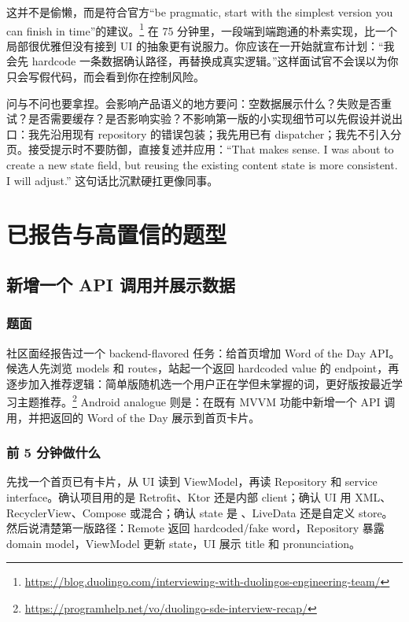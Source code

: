 这并不是偷懒，而是符合官方“be pragmatic, start with the simplest version you can finish in time”的建议。\srcofficial\footnote{\url{https://blog.duolingo.com/interviewing-with-duolingos-engineering-team/}} 在 75 分钟里，一段端到端跑通的朴素实现，比一个局部很优雅但没有接到 UI 的抽象更有说服力。你应该在一开始就宣布计划：“我会先 hardcode 一条数据确认路径，再替换成真实逻辑。”这样面试官不会误以为你只会写假代码，而会看到你在控制风险。

问与不问也要拿捏。会影响产品语义的地方要问：空数据展示什么？失败是否重试？是否需要缓存？是否影响实验？不影响第一版的小实现细节可以先假设并说出口：我先沿用现有 repository 的错误包装；我先用已有 dispatcher；我先不引入分页。接受提示时不要防御，直接复述并应用：“That makes sense. I was about to create a new state field, but reusing the existing content state is more consistent. I will adjust.” 这句话比沉默硬扛更像同事。

\section{已报告与高置信的题型}

\subsection{新增一个 API 调用并展示数据}

\subsubsection*{题面}

社区面经报告过一个 backend-flavored 任务：给首页增加 Word of the Day API。候选人先浏览 models 和 routes，站起一个返回 hardcoded value 的 endpoint，再逐步加入推荐逻辑：简单版随机选一个用户正在学但未掌握的词，更好版按最近学习主题推荐。\srccommunity\footnote{\url{https://programhelp.net/vo/duolingo-sde-interview-recap/}} Android analogue 则是：在既有 MVVM 功能中新增一个 API 调用，并把返回的 Word of the Day 展示到首页卡片。

\subsubsection*{前 5 分钟做什么}

先找一个首页已有卡片，从 UI 读到 ViewModel，再读 Repository 和 service interface。确认项目用的是 Retrofit、Ktor 还是内部 client；确认 UI 用 XML、RecyclerView、Compose 或混合；确认 state 是 、LiveData 还是自定义 store。然后说清楚第一版路径：Remote 返回 hardcoded/fake word，Repository 暴露 domain model，ViewModel 更新 state，UI 展示 title 和 pronunciation。

